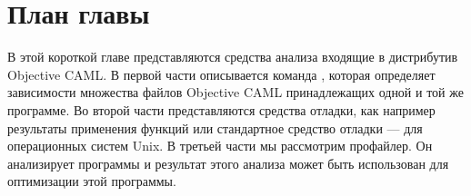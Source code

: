 \section {План главы}
\label{sec:overview_10}

В этой короткой главе представляются средства анализа входящие в дистрибутив
Objective CAML. В первой части описывается команда , которая 
определяет зависимости множества файлов Objective CAML принадлежащих одной и той 
же программе. Во второй части представляются средства отладки, как например
результаты применения функций или стандартное средство отладки --- 
 для операционных систем Unix. В третьей части мы рассмотрим 
профайлер. Он анализирует программы и результат этого анализа может быть 
использован для оптимизации этой программы.
